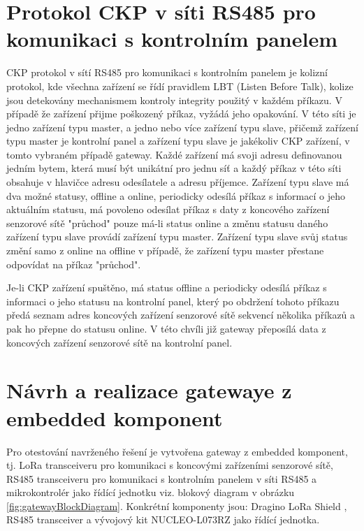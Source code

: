 \section{Protokol CKP v síti RS485 pro komunikaci s kontrolním panelem}
CKP protokol v sítí RS485 pro komunikaci s kontrolním panelem je kolizní protokol, kde všechna zařízení se řídí pravidlem LBT (Listen Before Talk), kolize jsou detekovány mechanismem kontroly integrity použitý v každém příkazu. V případě že zařízení přijme poškozený příkaz, vyžádá jeho opakování. 
V této síti je jedno zařízení typu master, a jedno nebo více zařízení typu slave, přičemž zařízení typu master je kontrolní panel a zařízení typu slave je jakékoliv CKP zařízení, v tomto vybraném případě gateway.
Každé zařízení má svoji adresu definovanou jedním bytem, která musí být unikátní pro jednu síť a každý příkaz v této síti obsahuje v hlavičce adresu odesílatele a adresu příjemce.
Zařízení typu slave má dva možné statusy, offline a online, periodicky odesílá příkaz s informací o jeho aktuálním statusu, má povoleno odesílat příkaz s daty z koncového zařízení senzorové sítě "průchod" pouze má-li status online a změnu statusu daného zařízení typu slave provádí zařízení typu master. 
Zařízení typu slave svůj status změní samo z online na offline v případě, že zařízení typu master přestane odpovídat na příkaz "průchod".

Je-li CKP zařízení spuštěno, má status offline a periodicky odesílá příkaz s informaci o jeho statusu na kontrolní panel, který po obdržení tohoto příkazu předá seznam adres koncových zařízení senzorové sítě sekvencí několika příkazů a pak ho přepne do statusu online. V této chvíli již gateway přeposílá data z koncových zařízení senzorové sítě na kontrolní panel.



\section{Návrh a realizace gatewaye z embedded komponent}
Pro otestování navrženého řešení je vytvořena gateway z embedded komponent, tj. LoRa transceiveru pro komunikaci s koncovými zařízeními senzorové sítě, RS485 transceiveru pro komunikaci s kontrolním panelem v síti RS485 a mikrokontrolér jako řídící jednotku viz. blokový diagram v obrázku \ref{fig:gatewayBlockDiagram}.
Konkrétní komponenty jsou: Dragino LoRa Shield \cite{draginoWiki}, RS485 transceiver \cite{rs485tr} a vývojový kit NUCLEO-L073RZ \cite{nucleo-l073RZ_ST} jako řídící jednotka.

